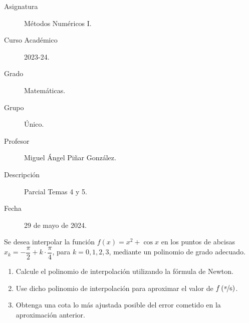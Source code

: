 \documentclass[12pt]{article}
\begin{document}

    
    

    \begin{description}
        \item[Asignatura] Métodos Numéricos I.
        \item[Curso Académico] 2023-24.
        \item[Grado] Matemáticas.
        \item[Grupo] Único.
        \item[Profesor] Miguel Ángel Piñar González.
        \item[Descripción] Parcial Temas 4 y 5.
        \item[Fecha] 29 de mayo de 2024.
    
    \end{description}
    \newpage
    
    \begin{ejercicio}
        Se desea interpolar la función $f(x)=x^2+\cos x$ en los puntos de abcisas $x_k=-\dfrac{\pi}{2} + k\cdot \dfrac{\pi}{4}$, para $k=0,1,2,3$, mediante un polinomio
        de grado adecuado.
        \begin{enumerate}
            \item Calcule el polinomio de interpolación utilizando la fórmula de Newton.
            \item Use dicho polinomio de interpolación para aproximar el valor de $f\left(\nicefrac{\pi}{6}\right)$.
            \item Obtenga una cota lo más ajustada posible del error cometido en la aproximación anterior.
        \end{enumerate}
    \end{ejercicio}
\end{document}
